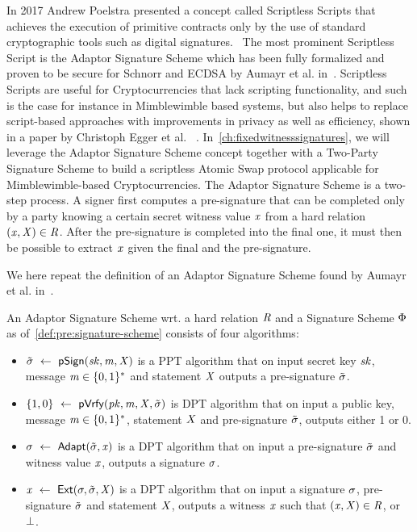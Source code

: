 In 2017 Andrew Poelstra presented a concept called Scriptless Scripts that achieves the execution of primitive contracts only by the use of standard cryptographic tools such as digital signatures.~\cite{poelstra2017scriptless}
The most prominent Scriptless Script is the Adaptor Signature Scheme which has been fully formalized and proven to be secure for Schnorr and ECDSA by Aumayr et al. in~\cite{aumayr2020bitcoinchannels}.
Scriptless Scripts are useful for Cryptocurrencies that lack scripting functionality, and such is the case for instance in Mimblewimble based systems, but also helps to replace script-based approaches with improvements in privacy as well as efficiency, shown in a paper by Christoph Egger et al. ~\cite{egger2019atomic}.
In~\cref{ch:fixedwitnesssignatures}, we will leverage the Adaptor Signature Scheme concept together with a Two-Party Signature Scheme to build a scriptless Atomic Swap protocol applicable for Mimblewimble-based Cryptocurrencies.
The Adaptor Signature Scheme is a two-step process.
A signer first computes a pre-signature that can be completed only by a party knowing a certain secret witness value $\mathit{x}$ from a hard relation $(\mathit{x}, \mathit{X}) \in \mathit{R}$.
After the pre-signature is completed into the final one, it must then be possible to extract $\mathit{x}$ given the final and the pre-signature.

We here repeat the definition of an Adaptor Signature Scheme found by Aumayr et al. in~\cite{aumayr2020bitcoinchannels}.

\begin{definition}\label{def:pre:script:apt}
    An Adaptor Signature Scheme wrt. a hard relation $\mathit{R}$ and a Signature Scheme $\Phi$ as of~\cref{def:pre:signature-scheme} consists of four algorithms:
    \begin{itemize}
        \item $\tilde{\sigma} ~\leftarrow~ \mathsf{pSign}(\mathit{sk}, \mathit{m}, \mathit{X})$ is a PPT algorithm that on input secret key $\mathit{sk}$, message $\mathit{m} \in \{0,1\}^{*}$ and statement $\mathit{X}$ outputs a pre-signature $\tilde{\sigma}$.
        \item $\{1,0\} ~\leftarrow~ \mathsf{pVrfy}(\mathit{pk}, \mathit{m}, \mathit{X}, \tilde{\sigma})$ is DPT algorithm that on input a public key, message $\mathit{m} \in \{0,1\}^{*}$, statement $\mathit{X}$ and pre-signature $\tilde{\sigma}$, outputs either 1 or 0.
        \item $\sigma ~\leftarrow~ \mathsf{Adapt}(\tilde{\sigma}, \mathit{x})$ is a DPT algorithm that on input a pre-signature $\tilde{\sigma}$ and witness value $\mathit{x}$, outputs a signature $\sigma$.
        \item $\mathit{x} ~\leftarrow~ \mathsf{Ext}(\sigma, \tilde{\sigma}, \mathit{X})$ is a DPT algorithm that on input a signature $\sigma$, pre-signature $\tilde{\sigma}$ and statement $\mathit{X}$, outputs a witness $\mathit{x}$ such that $(\mathit{x}, \mathit{X}) \in \mathit{R}$, or $\bot$.
    \end{itemize}
\end{definition}
